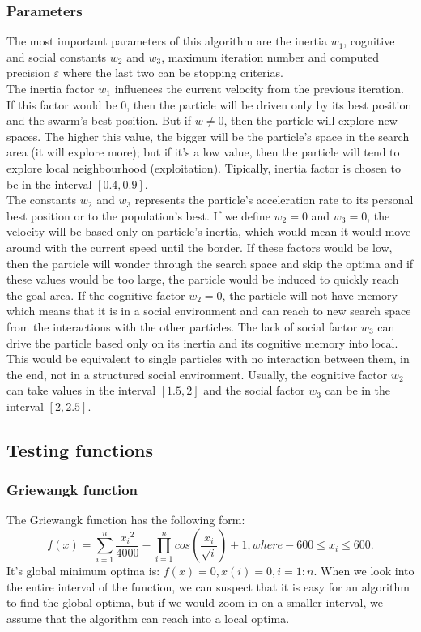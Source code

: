 \documentclass{article}
\begin{document}
\subsubsection{Parameters}
The most important parameters of this algorithm are the inertia $w_1$, cognitive and social constants $w_2$ and $w_3$, maximum iteration number and computed precision $\varepsilon$ where the last two can be stopping criterias.\\
The inertia factor $w_1$ influences the current velocity from the previous iteration. If this factor would be 0, then the particle will be driven only by its best position and the swarm's best position. But if $w \neq 0$, then the particle will explore new spaces. The higher this value, the bigger will be the particle's space in the search area (it will explore more); but if it's a low value, then the particle will tend to explore local neighbourhood (exploitation). Tipically, inertia factor is chosen to be in the interval $[0.4, 0.9]$.\\
The constants $w_2$ and $w_3$ represents the particle's acceleration rate to its personal best position or to the population's best. If we define $w_2 = 0$ and $w_3 = 0$, the velocity will be based only on particle's inertia, which would mean it would move around with the current speed until the border. If these factors would be low, then the particle will wonder through the search space and skip the optima and if these values would be too large, the particle would be induced to quickly reach the goal area. If the cognitive factor $w_2 = 0$, the particle will not have memory which means that it is in a social environment and can reach to new search space from the interactions with the other particles. The lack of social factor $w_3$ can drive the particle based only on its inertia and its cognitive memory into local. This would be equivalent to single particles with no interaction between them, in the end, not in a structured social environment. Usually, the cognitive factor $w_2$ can take values in the interval $[1.5, 2]$ and the social factor $w_3$ can be in the interval $[2, 2.5]$.
\subsection{Testing functions}
\subsubsection{Griewangk function}
The Griewangk function has the following form:
$$f(x) = \sum_{i = 1}^n \frac{{x_i}^2}{4000} - \prod_{i = 1}^n cos\left(\frac{x_i}{\sqrt{i}}\right) + 1, where -600 \leq x_i \leq 600.$$
It's global minimum optima is: $f(x) = 0, x(i) = 0, i = 1:n$. When we look into the entire interval of the function, we can suspect that it is easy for an algorithm to find the global optima, but if we would zoom in on a smaller interval, we assume that the algorithm can reach into a local optima.
\end{document}
